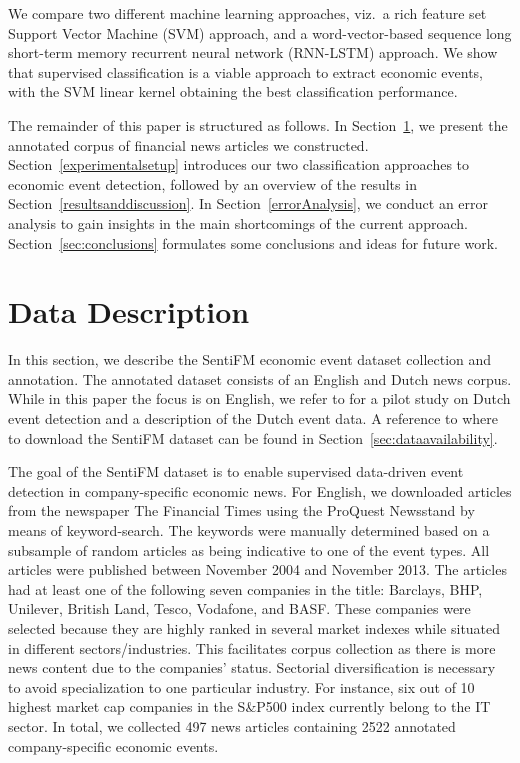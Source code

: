 \documentclass[11pt,a4paper]{article}
\begin{document}
We compare two different machine learning approaches, viz.~a rich feature set Support Vector Machine (SVM) approach, and a word-vector-based sequence long short-term memory recurrent neural network (RNN-LSTM) approach.
We show that supervised classification is a viable approach to extract economic events, with the SVM linear kernel obtaining the best classification performance.

The remainder of this paper is structured as follows. In Section~\ref{datadescription}, we present the annotated corpus of financial news articles we constructed.
Section~\ref{experimentalsetup} introduces our two classification approaches to economic event detection, followed by an overview of the results in Section~\ref{resultsanddiscussion}. In Section~\ref{errorAnalysis}, we conduct an error analysis to gain insights in the main shortcomings of the current approach.  
Section~\ref{sec:conclusions} formulates some conclusions and ideas for future work.

\section{Data Description} \label{datadescription}

In this section, we describe the SentiFM economic event dataset collection and annotation.
The annotated dataset consists of an English and Dutch news corpus.
While in this paper the focus is on English, we refer to \citet{lefever2016dutcheventdetection} for a pilot study on Dutch event detection and a description of the Dutch event data.
A reference to where to download the SentiFM dataset can be found in Section~\ref{sec:dataavailability}.

The goal of the SentiFM dataset is to enable supervised data-driven event detection in company-specific economic news.
For English, we downloaded articles from the newspaper The Financial Times using the ProQuest Newsstand by means of keyword-search.
The keywords were manually determined based on a subsample of random articles as being indicative to one of the event types.
All articles were published between November 2004 and November 2013.
The articles had at least one of the following seven companies in the title: Barclays, BHP, Unilever, British Land, Tesco, Vodafone, and BASF.
These companies were selected because they are highly ranked in several market indexes while situated in different sectors/industries.
This facilitates corpus collection as there is more news content due to the companies' status.
Sectorial diversification is necessary to avoid specialization to one particular industry.
For instance, six out of 10 highest market cap companies in the S\&P500 index currently belong to the IT sector.
In total, we collected 497 news articles containing 2522 annotated company-specific economic events.
\end{document}
